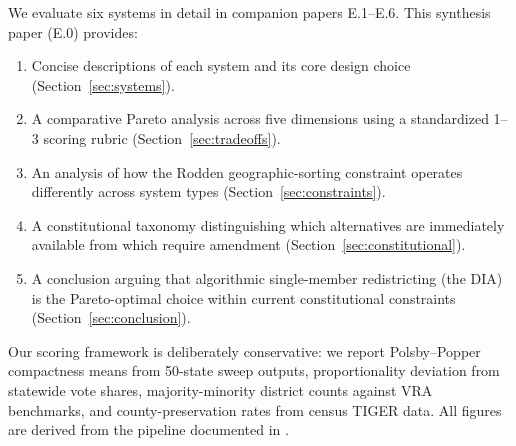 We evaluate six systems in detail in companion papers E.1--E.6.  This synthesis
paper (E.0) provides:
\begin{enumerate}
  \item Concise descriptions of each system and its core design choice
        (Section~\ref{sec:systems}).
  \item A comparative Pareto analysis across five dimensions using a
        standardized 1--3 scoring rubric (Section~\ref{sec:tradeoffs}).
  \item An analysis of how the Rodden geographic-sorting constraint operates
        differently across system types (Section~\ref{sec:constraints}).
  \item A constitutional taxonomy distinguishing which alternatives are
        immediately available from which require amendment
        (Section~\ref{sec:constitutional}).
  \item A conclusion arguing that algorithmic single-member redistricting
        (the DIA) is the Pareto-optimal choice within current constitutional
        constraints (Section~\ref{sec:conclusion}).
\end{enumerate}

Our scoring framework is deliberately conservative: we report Polsby--Popper
compactness means from 50-state sweep outputs, proportionality deviation from
statewide vote shares, majority-minority district counts against VRA benchmarks,
and county-preservation rates from census TIGER data.  All figures are derived
from the pipeline documented in \citet{dellaLibera2026mec}.
